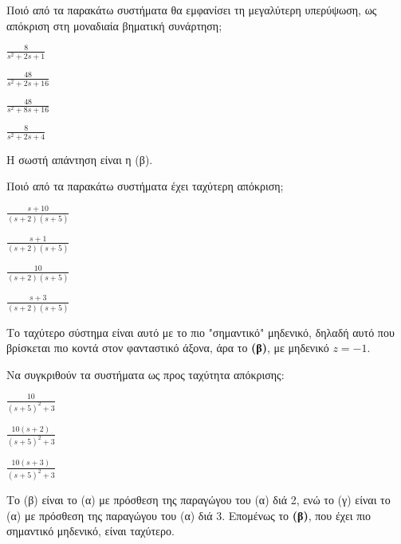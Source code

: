 \documentclass[11pt,a4paper,notitlepage,fleqn]{article}
\begin{document}
\begin{exercise}
Ποιό από τα παρακάτω συστήματα θα εμφανίσει τη μεγαλύτερη υπερύψωση, ως απόκριση στη μοναδιαία
βηματική συνάρτηση;
\begin{enumgreekparen}
	\item \( \displaystyle \frac{8}{s^2+2s+1} \)
	\item \( \displaystyle \frac{48}{s^2+2s+16} \)
	\item \( \displaystyle \frac{48}{s^2+8s+16} \)
	\item \( \displaystyle \frac{8}{s^2+2s+4} \)
\end{enumgreekparen}
\tcblower

Η σωστή απάντηση είναι η (β).

\end{exercise}


\begin{exercise}
Ποιό από τα παρακάτω συστήματα έχει ταχύτερη απόκριση;
\begin{enumgreekparen}
	\item \( \displaystyle \frac{s+10}{(s+2)(s+5)} \)
	\item \( \displaystyle \frac{s+1}{(s+2)(s+5)} \)
	\item \( \displaystyle \frac{10}{(s+2)(s+5)} \)
	\item \( \displaystyle \frac{s+3}{(s+2)(s+5)} \)
\end{enumgreekparen}

\tcblower

Το ταχύτερο σύστημα είναι αυτό με το πιο "σημαντικό" μηδενικό, δηλαδή αυτό που βρίσκεται πιο
κοντά στον φανταστικό άξονα, άρα το \textbf{(β)}, με μηδενικό \( z = -1 \).

\end{exercise}


\begin{exercise}
Να συγκριθούν τα συστήματα ως προς ταχύτητα απόκρισης:
\begin{enumgreekparen}
	\item \( \displaystyle \frac{10}{(s+5)^2+3} \)
	\item \( \displaystyle \frac{10(s+2)}{(s+5)^2+3} \)
	\item \( \displaystyle \frac{10(s+3)}{(s+5)^2+3} \)
\end{enumgreekparen}
\tcblower

Το (β) είναι το (α) με πρόσθεση της παραγώγου του (α) διά 2, ενώ το (γ) είναι το (α) με
πρόσθεση της παραγώγου του (α) διά 3. Επομένως το \textbf{(β)}, που έχει πιο σημαντικό
μηδενικό, είναι ταχύτερο.
\end{exercise}
\end{document}

